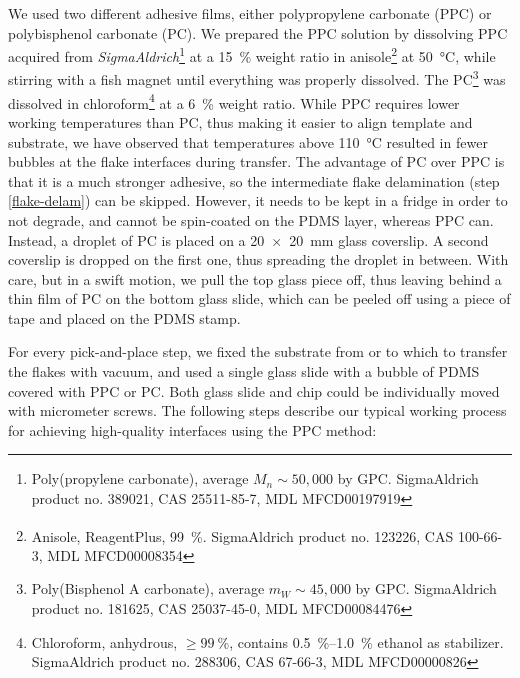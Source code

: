 We used two different adhesive films, either polypropylene carbonate (PPC) or polybisphenol carbonate (PC).
%
We prepared the PPC solution by dissolving PPC acquired from \textit{SigmaAldrich}\footnote{Poly(propylene carbonate), average $M_n\sim50,000$ by GPC. SigmaAldrich product no. 389021, CAS 25511-85-7, MDL MFCD00197919} at a \SI{15}{\percent} weight ratio in anisole\footnote{Anisole, ReagentPlus\textsuperscript{\textregistered}, \SI{99}{\percent}. SigmaAldrich product no. 123226, CAS 100-66-3, MDL MFCD00008354} at \SI{50}{\celsius}, while stirring with a fish magnet until everything was properly dissolved.
%
The PC\footnote{Poly(Bisphenol A carbonate), average $m_W\sim 45,000$ by GPC. SigmaAldrich product no. 181625, CAS 25037-45-0, MDL MFCD00084476} was dissolved in chloroform\footnote{Chloroform, anhydrous, $\geq\SI{99}{\percent}$, contains \SIrange{0.5}{1.0}{\percent} ethanol as stabilizer. SigmaAldrich product no. 288306, CAS 67-66-3, MDL MFCD00000826} at a \SI{6}{\percent} weight ratio.
%
While PPC requires lower working temperatures than PC, thus making it easier to align template and substrate, we have observed that temperatures above \SI{110}{\celsius} resulted in fewer bubbles at the flake interfaces during transfer.
%
The advantage of PC over PPC is that it is a much stronger adhesive, so the intermediate flake delamination (step \ref{flake-delam}) can be skipped.
%
However, it needs to be kept in a fridge in order to not degrade, and cannot be spin-coated on the PDMS layer, whereas PPC can.
%
Instead, a droplet of PC is placed on a \SI{20x20}{\milli\meter} glass coverslip.
%
A second coverslip is dropped on the first one, thus spreading the droplet in between.
%
With care, but in a swift motion, we pull the top glass piece off, thus leaving behind a thin film of PC on the bottom glass slide, which can be peeled off using a piece of tape and placed on the PDMS stamp.

For every pick-and-place step, we fixed the substrate from or to which to transfer the flakes with vacuum, and used a single glass slide with a bubble of PDMS covered with PPC or PC.
%
Both glass slide and chip could be individually moved with micrometer screws.
%
The following steps describe our typical working process for achieving high-quality interfaces using the PPC method:

